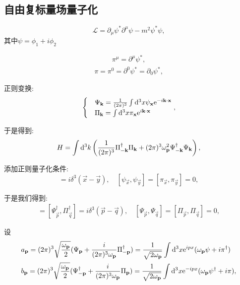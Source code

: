 \subsection{自由复标量场量子化}
\begin{equation}
    \mathcal L=\partial_\mu\psi^*\partial^\mu\psi-m^2\psi^*\psi,
\end{equation}
其中$\psi=\phi_1+i\phi_2$

\begin{align}
    \pi^\mu=\partial^\mu\psi^*,
\end{align}
\begin{align}
    \pi=\pi^0=\partial^0\psi^*=\partial_0\psi^*,
\end{align}

正则变换:
\begin{align}
    \begin{cases}
        &\Psi_{\mathbf{k}}=\frac1{(2\pi)^{3}}\int\mathrm d^3x\psi_{\mathbf{x}}\mathrm e^{-i\mathbf{k}\cdot\mathbf{x}}\\
        &\Pi_{\mathbf{k}}=\int\mathrm d^3x\pi_{\mathbf{x}}\mathrm e^{i\mathbf{k}\cdot\mathbf{x}}
    \end{cases},
\end{align}

于是得到:
\begin{equation}
    H=\int\mathrm d^3k\left(\frac1{(2\pi)^{3}}\Pi^\dagger_{-\mathbf{k}}\Pi_{\mathbf{k}}+(2\pi)^{3}\omega_{\mathbf{p}}^2\Psi_{-\mathbf{k}}^\dagger\Psi_{\mathbf{k}}\right),
\end{equation}

添加正则量子化条件:
\begin{equation}
    [\psi_{\vec x}, \pi_{\vec y}]=i\delta^3(\vec x-\vec y), \quad [\psi_\vec x, \psi_\vec y]=[\pi_\vec x, \pi_\vec y]=0,
\end{equation}

于是我们得到:
\begin{align}
    [\Psi_\vec p, \Pi_\vec q]=[\Psi^\dagger_\vec p, \Pi^\dagger_\vec q]=i\delta^3(\vec p-\vec q), \quad [\Psi_\vec p, \Psi_\vec q]=[\Pi_\vec p, \Pi_\vec q]=0,
\end{align}

设
\begin{align}
    &a_{\mathbf{p}}=(2\pi)^{3}\sqrt{\frac{\omega_{\mathbf{p}}}2}(\Psi_{\mathbf{p}}+\frac i{(2\pi)^{3}\omega_{\mathbf{p}}}\Pi^\dagger_{-\mathbf{p}})=\frac1{\sqrt{2\omega_{\mathbf{p}}}}\int\mathrm d^3x\mathrm e^{ipx}(\omega_{\mathbf{p}}\psi+i\pi^\dagger)\\
    &b_{\mathbf{p}}=(2\pi)^{3}\sqrt{\frac{\omega_{\mathbf{p}}}2}(\Psi_{-\mathbf{p}}^\dagger+\frac i{(2\pi)^{3}\omega_{\mathbf{p}}}\Pi_{\mathbf{p}})=\frac1{\sqrt{2\omega_{\mathbf{p}}}}\int\mathrm d^3x\mathrm e^{-ipx}(\omega_{\mathbf{p}}\psi^\dagger+i\pi),
\end{align}

